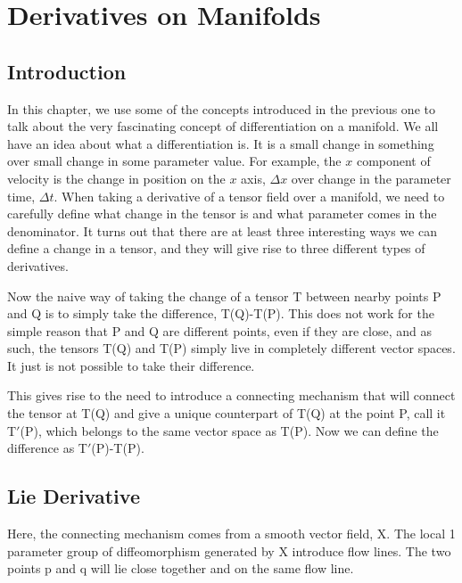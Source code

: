 
\chapter{Derivatives on Manifolds}
\label{ch:chapter3}


\section{Introduction}

In this chapter, we use some of the concepts introduced in the previous one to talk about the very fascinating concept of differentiation on a manifold. We all have an idea about what a differentiation is. It is a small change in something over small change in some parameter value. For example, the $x$ component of velocity is the change in position on the $x$ axis, $\Delta x$ over change in the parameter time, $\Delta t $. When taking a derivative of a tensor field over a manifold, we need to carefully define what change in the tensor is and what parameter comes in the denominator. It turns out that there are at least three interesting ways we can define a change in a tensor, and they will give rise to three different types of derivatives.

Now the naive way of taking the change of a tensor T between nearby points P and Q is to simply take the difference, T(Q)-T(P). This does not work for the simple reason that P and Q are different points, even if they are close, and as such, the tensors T(Q) and T(P) simply live in completely different vector spaces. It just is not possible to take their difference. 

This gives rise to the need to introduce a connecting mechanism that will connect the tensor at T(Q) and give a unique counterpart of T(Q) at the point P, call it T$'$(P), which belongs to the same vector space as T(P). Now we can define the difference as T$'$(P)-T(P). 

\section{Lie Derivative}
Here, the connecting mechanism comes from a smooth vector field, X. The local 1 parameter group of diffeomorphism generated by X introduce flow lines. The two points p and q will lie close together and on the same flow line. 

